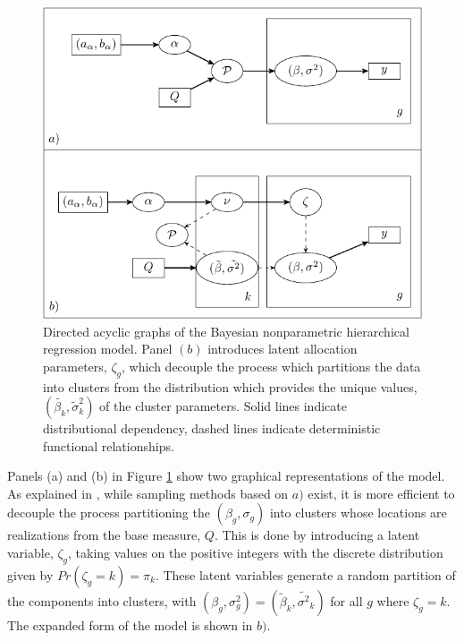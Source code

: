 {\begin{figure}
\includegraphics[width=.8\textwidth]{my_dag}
\caption{\small Directed acyclic graphs of the Bayesian nonparametric hierarchical regression model. Panel $(b)$ introduces latent allocation parameters, $\zeta_g$, which decouple the process which partitions the data into clusters from the distribution which provides the unique values, $(\tilde{\beta_k},\tilde{\sigma}_k^2)$ of the cluster parameters. Solid lines indicate distributional dependency, dashed lines indicate deterministic functional relationships.}
\label{dag}
\end{figure}

Panels (a) and (b) in Figure \ref{dag} show two graphical representations of the model. As explained in \cite{neal2000}, while sampling methods based on $a)$ exist, it is more efficient to decouple the process partitioning the $(\beta_g,\sigma_g)$ into clusters whose locations are realizations from the base measure, $Q$. This is done by introducing a latent variable, $\zeta_g$, taking values on the positive integers with the discrete distribution given by $Pr(\zeta_g=k)=\pi_k$. These latent variables generate a random partition of the components into clusters, with $(\beta_g,\sigma^2_g)=(\tilde{\beta}_k,\tilde{\sigma^2}_k)$ for all $g$ where $\zeta_g=k$. The expanded form of the model is shown in $b)$.

}
